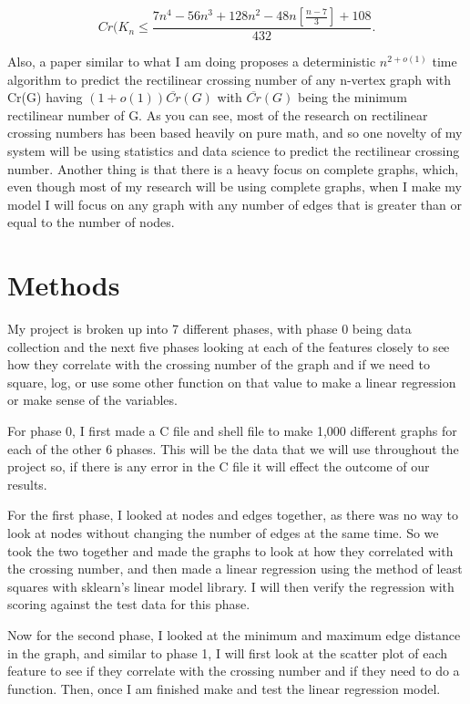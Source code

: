 \documentclass{article}
\begin{document}
\[ Cr(K_{n} \leq \frac{7n^4 - 56n^3 + 128n^2 -48n[\frac{n-7}{3}] + 108}{432}.\]\cite{JENSEN1971212}

Also, a paper similar to what I am doing proposes a deterministic $n^{2 + o(1)}$ time algorithm to predict the rectilinear crossing number of any n-vertex graph with Cr(G) having $(1 + o(1))\overline{Cr}(G)$ with  $\overline{Cr}(G)$ being the minimum rectilinear number of G.\cite{FOX201945}
As you can see, most of the research on rectilinear crossing numbers has been based heavily on pure math, and so one novelty of my system will be using statistics and data science to predict the rectilinear crossing number. Another thing is that there is a heavy focus on complete graphs, which, even though most of my research will be using complete graphs, when  I make my model I will focus on any graph with any number of edges that is greater than or equal to the number of nodes.  

\section*{Methods}
My project is broken up into 7 different phases, with phase 0 being data collection and the next five phases looking at each of the features closely to see how they correlate with the crossing number of the graph and if we need to square, log, or use some other function on that value to make a linear regression or make sense of the variables.

For phase 0, I first made a C file and shell file to make 1,000 different graphs for each of the other 6 phases. This will be the data that we will use throughout the project so, if there is any error in the C file it will effect the outcome of our results.

For the first phase, I looked at nodes and edges together, as there was no way to look at nodes without changing the number of edges at the same time. So we took the two together and made the graphs to look at how they correlated with the crossing number, and then made a linear regression using the method of least squares with sklearn's linear model library. I will then verify the regression with scoring against the test data for this phase.

Now for the second phase, I looked at the minimum and maximum edge distance in the graph, and similar to phase 1, I will first look at the scatter plot of each feature to see if they correlate with the crossing number and if they need to do a function. Then, once I am finished make and test the linear regression model.
\end{document}
